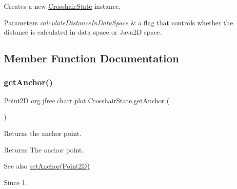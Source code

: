 Creates a new {\ttfamily \mbox{\hyperlink{classorg_1_1jfree_1_1chart_1_1plot_1_1_crosshair_state}{Crosshair\+State}}} instance.


\begin{DoxyParams}{Parameters}
{\em calculate\+Distance\+In\+Data\+Space} & a flag that controls whether the distance is calculated in data space or Java2D space. \\
\hline
\end{DoxyParams}


\subsection{Member Function Documentation}
\mbox{\label{classorg_1_1jfree_1_1chart_1_1plot_1_1_crosshair_state_a7f39f49282ff35721eab0e18736c4b43}} 
\subsubsection{\texorpdfstring{get\+Anchor()}{getAnchor()}}
{\footnotesize\ttfamily Point2D org.\+jfree.\+chart.\+plot.\+Crosshair\+State.\+get\+Anchor (\begin{DoxyParamCaption}{ }\end{DoxyParamCaption})}

Returns the anchor point.

\begin{DoxyReturn}{Returns}
The anchor point.
\end{DoxyReturn}
\begin{DoxySeeAlso}{See also}
\mbox{\hyperlink{classorg_1_1jfree_1_1chart_1_1plot_1_1_crosshair_state_a138d7cded9ca3a55a8faf9a313fd0e83}{set\+Anchor(\+Point2\+D)}}
\end{DoxySeeAlso}
\begin{DoxySince}{Since}
1.. 
\end{DoxySince}
\mbox{\label{classorg_1_1jfree_1_1chart_1_1plot_1_1_crosshair_state_a36335b127d464bac357e3e9b60d45870}} 
